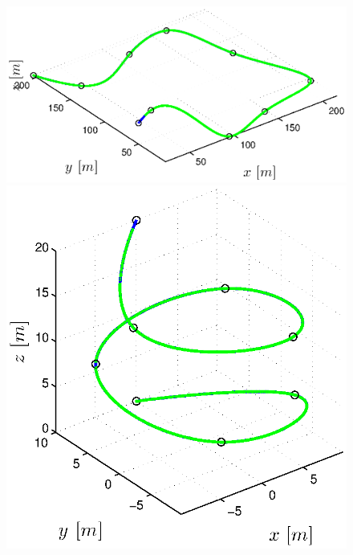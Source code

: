 \begin{figure}[h]
\begin{minipage}[t]{0.32\textwidth}
  \end{minipage}
  \vspace{5pt}
  \begin{minipage}[t]{0.32\textwidth}
    \includegraphics[width = \textwidth]{trackings/figure_3D_road_SplineDegree3_crossTrack_Disturbance_0}
  \end{minipage}
  \hfill
  \begin{minipage}[t]{0.32\textwidth}
    \includegraphics[width = \textwidth]{trackings/figure_3D_helix_SplineDegree3_crossTrack_Disturbance_0}
  \end{minipage}
  \hfill
  \begin{minipage}[t]{0.32\textwidth}

\end{minipage}
\end{figure}
